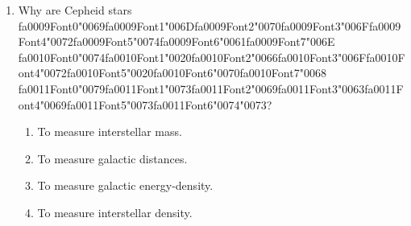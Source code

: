 \documentclass[12pt]{article}
\begin{document}
\begin{enumerate}[label=\arabic*.]
\item Why are Cepheid stars {\csname fa0009Font0\endcsname\char"0069}{\csname fa0009Font1\endcsname\char"006D}{\csname fa0009Font2\endcsname\char"0070}{\csname fa0009Font3\endcsname\char"006F}{\csname fa0009Font4\endcsname\char"0072}{\csname fa0009Font5\endcsname\char"0074}{\csname fa0009Font6\endcsname\char"0061}{\csname fa0009Font7\endcsname\char"006E} {\csname fa0010Font0\endcsname\char"0074}{\csname fa0010Font1\endcsname\char"0020}{\csname fa0010Font2\endcsname\char"0066}{\csname fa0010Font3\endcsname\char"006F}{\csname fa0010Font4\endcsname\char"0072}{\csname fa0010Font5\endcsname\char"0020}{\csname fa0010Font6\endcsname\char"0070}{\csname fa0010Font7\endcsname\char"0068} {\csname fa0011Font0\endcsname\char"0079}{\csname fa0011Font1\endcsname\char"0073}{\csname fa0011Font2\endcsname\char"0069}{\csname fa0011Font3\endcsname\char"0063}{\csname fa0011Font4\endcsname\char"0069}{\csname fa0011Font5\endcsname\char"0073}{\csname fa0011Font6\endcsname\char"0074}{\char"0073}?
\begin{enumerate}[label=(\alph*)]
    \item To measure interstellar mass.
    \item To measure galactic distances.
    \item To measure galactic energy-density.
    \item To measure interstellar density.
\end{enumerate}
\end{enumerate}
\end{document}
